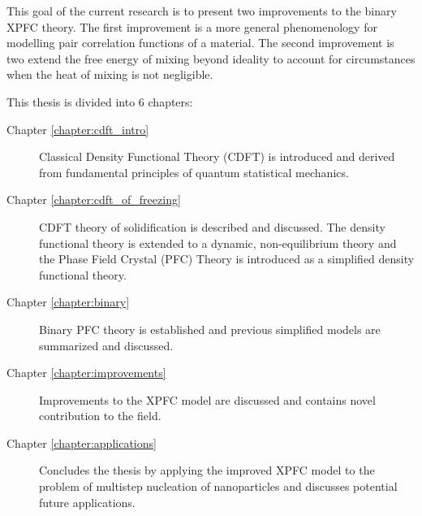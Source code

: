 \label{chapter:introduction}











This goal of the current research is to present two improvements to the
binary XPFC theory. The first improvement is a more general phenomenology
for modelling pair correlation functions of a material. The second 
improvement is two extend the free energy of mixing beyond ideality to 
account for circumstances when the heat of mixing is not negligible.


This thesis is divided into 6 chapters:
%
\begin{description}
    \item [Chapter \ref{chapter:cdft_intro}] { Classical Density Functional
        Theory (CDFT) is introduced and derived from fundamental principles of
        quantum statistical mechanics.
    }
    \item [Chapter \ref{chapter:cdft_of_freezing}] { CDFT theory of
        solidification is described and discussed. The density functional
        theory is extended to a dynamic, non-equilibrium theory and the Phase
        Field Crystal (PFC) Theory is introduced as a simplified density
        functional theory.
    }
    \item [Chapter \ref{chapter:binary}] { Binary PFC theory is established and
        previous simplified models are summarized and discussed.
    }
    \item [Chapter \ref{chapter:improvements}] { Improvements to the XPFC model
        are discussed and contains novel contribution to the field.
    }
    \item [Chapter \ref{chapter:applications}] { Concludes the thesis by
        applying the improved XPFC model to the problem of multistep nucleation
        of nanoparticles and discusses potential future applications.
    } 
\end{description}
%

